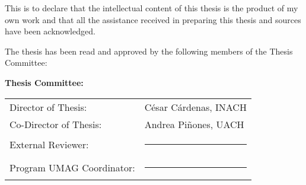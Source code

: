 \documentclass[
$if(draft)$
  draft,
$endif$
$if(fontsize)$
  $fontsize$,
$endif$
$if(margins)$
  $margins$,
$endif$
$if(spacing)$
  $spacing$,
$endif$
$if(clearpagestyle)$
  $clearpagestyle$,
$endif$
$if(notespacing)$
  $notespacing$,
$endif$
$for(classoption)$
  $classoption$$sep$,
$endfor$
]{templates/ut-thesis}
\begin{document}
\begin{preliminary}
\begin{declaration}
This is to declare that the intellectual content of this thesis is the product of my own work and that all the assistance received in preparing this thesis and sources have been acknowledged.

\vspace{2cm}

The thesis has been read and approved by the following members of the Thesis Committee:

\vspace{1cm}

\noindent\textbf{Thesis Committee:} \\[1cm]
\begin{tabular}{ll}
Director of Thesis:         & César Cárdenas, INACH \\[1.2cm]
Co-Director of Thesis:      & Andrea Piñones, UACH \\[1.2cm]
External Reviewer:          & \rule{8cm}{0.4pt} \\[1.2cm]
Program UMAG Coordinator:   & \rule{8cm}{0.4pt} \\
\end{tabular}

\end{declaration}









\end{preliminary}
\end{document}
